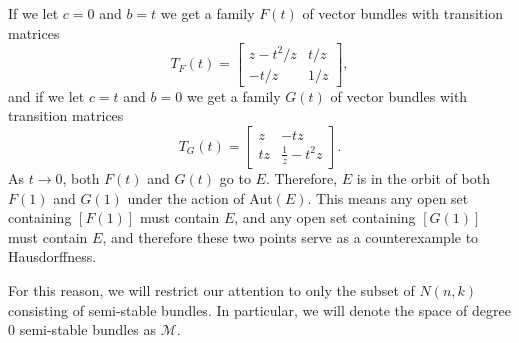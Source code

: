 \documentclass[]{article}
\newcommand{\MM}{\mathcal{M}}
\begin{document}
	If we let $c=0$ and $b=t$ we get a family $F(t)$ of vector bundles with transition matrices
	\begin{equation*}
		T_{F}(t) = \begin{bmatrix}
		z-t^2/z & t/z\\
		-t/z & 1/z
		\end{bmatrix},
	\end{equation*}
	and if we let $c=t$ and $b=0$ we get a family $G(t)$ of vector bundles with transition matrices
	\begin{equation*}
		T_{G}(t) = \begin{bmatrix}
		z & -tz\\
		tz & \frac{1}{z}-t^2 z
		\end{bmatrix}.
	\end{equation*}
	As $t\to 0$, both $F(t)$ and $G(t)$ go to $E$. Therefore, $E$ is in the orbit of both $F(1)$ and $G(1)$ under the action of Aut$(E)$. This means any open set containing $[F(1)]$ must contain $E$, and any open set containing $[G(1)]$ must contain $E$, and therefore these two points serve as a counterexample to Hausdorffness.
	
	For this reason, we will restrict our attention to only the subset of $N(n,k)$ consisting of semi-stable bundles. In particular, we will denote the space of degree $0$ semi-stable bundles as $\MM$. 
	
	
	
\end{document}
